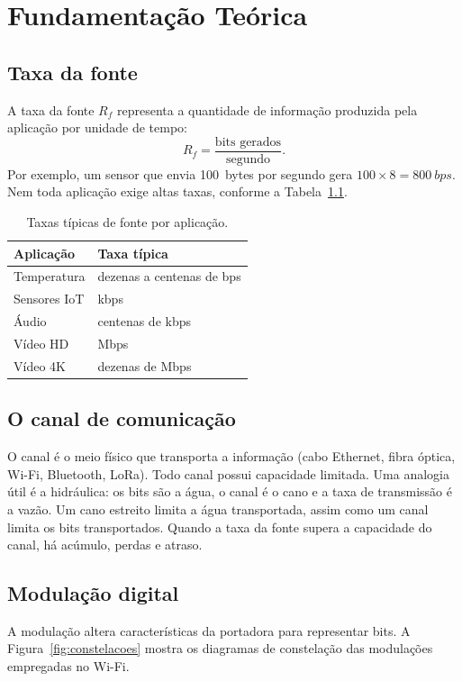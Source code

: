 \documentclass[
  12pt,
  a4paper,
  oneside,
  brazil,
  chapter=TITLE,
  section=TITLE,
]{abntex2}
\begin{document}
\chapter{Fundamentação Teórica}

\section{Taxa da fonte}
A taxa da fonte $R_f$ representa a quantidade de informação produzida pela
aplicação por unidade de tempo:
\begin{equation}
  R_f = \frac{\text{bits gerados}}{\text{segundo}}.
\end{equation}
Por exemplo, um sensor que envia \SI{100}{bytes} por segundo gera
$100 \times 8 = \SI{800}{bps}$. Nem toda aplicação exige altas taxas, conforme a
Tabela~\ref{tab:fontes}.

\begin{table}[H]
  \centering
  \caption{Taxas típicas de fonte por aplicação.}
  \label{tab:fontes}
  \begin{tabular}{ll}
    \toprule
    \textbf{Aplicação} & \textbf{Taxa típica} \\
    \midrule
    Temperatura     & dezenas a centenas de bps \\
    Sensores IoT    & kbps \\
    Áudio           & centenas de kbps \\
    Vídeo HD        & Mbps \\
    Vídeo 4K        & dezenas de Mbps \\
    \bottomrule
  \end{tabular}
\end{table}

\section{O canal de comunicação}
O canal é o meio físico que transporta a informação (cabo Ethernet, fibra
óptica, Wi-Fi, Bluetooth, LoRa). Todo canal possui capacidade limitada. Uma
analogia útil é a hidráulica: os bits são a água, o canal é o cano e a taxa de
transmissão é a vazão. Um cano estreito limita a água transportada, assim como
um canal limita os bits transportados. Quando a taxa da fonte supera a
capacidade do canal, há acúmulo, perdas e atraso.

\section{Modulação digital}
A modulação altera características da portadora para representar bits. A
Figura~\ref{fig:constelacoes} mostra os diagramas de constelação das modulações
empregadas no Wi-Fi.
\end{document}
